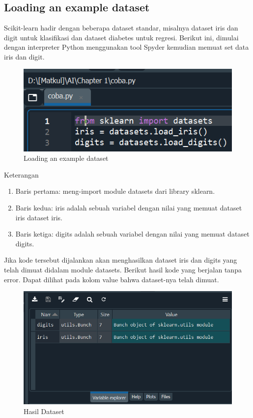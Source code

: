 \subsection{Loading an example dataset}

\par Scikit-learn hadir dengan beberapa dataset standar, misalnya dataset iris dan digit untuk klasifikasi dan dataset diabetes untuk regresi. Berikut ini, dimulai dengan interpreter Python menggunakan tool Spyder kemudian memuat set data iris dan digit.\cite{scikit}
    \begin{figure}[H]
    \centering
    \includegraphics[width=12cm]{figures/chapter1/2.PNG}
    \caption{Loading an example dataset}
    \end{figure}

\par Keterangan
    \begin{enumerate}
        \item Baris pertama: meng-import module datasets dari library sklearn.
        \item Baris kedua: iris adalah sebuah variabel dengan nilai yang memuat dataset iris dataset iris.
        \item Baris ketiga: digits adalah sebuah variabel dengan nilai yang memuat dataset digits.
    \end{enumerate}

\par Jika kode tersebut dijalankan akan menghasilkan dataset iris dan digits yang telah dimuat didalam module datasets. Berikut hasil kode yang berjalan tanpa error. Dapat dilihat pada kolom value bahwa dataset-nya telah dimuat.
    \begin{figure}[H]
    \centering
    \includegraphics[width=12cm]{figures/chapter1/3.PNG}
    \caption{Hasil Dataset}
    \end{figure}

